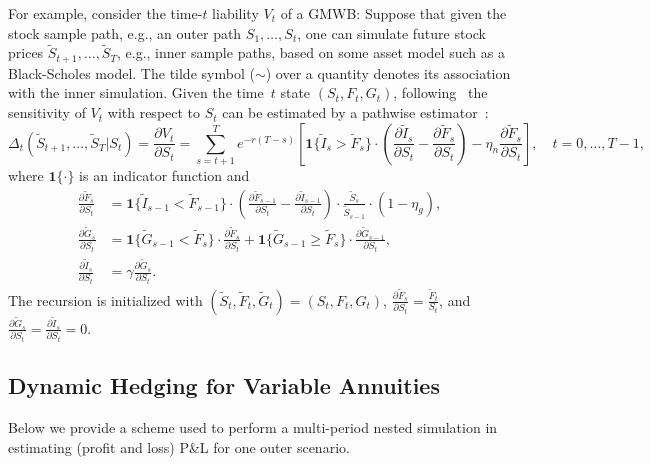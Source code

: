 \documentclass{article}
\newcommand{\Stilde}{\widetilde{S}}
\newcommand{\Itilde}{\widetilde{I}}
\newcommand{\Ftilde}{\widetilde{F}}
\newcommand{\Gtilde}{\widetilde{G}}
\begin{document}
For example, consider the time-$t$ liability $V_t$ of a GMWB:
Suppose that given the stock sample path, e.g., an outer path $S_1,\ldots,S_t$, one can simulate future stock prices $\Stilde_{t+1},\ldots,\Stilde_{T}$, e.g., inner sample paths, based on some asset model such as a Black-Scholes model.
The tilde symbol ($\sim$) over a quantity denotes its association with the inner simulation.
Given the time~$t$ state $(S_t,F_t,G_t)$, following~\cite{cathcart2015calculating} the sensitivity of $V_t$ with respect to $S_t$ can be estimated by a pathwise estimator~\citep{glasserman2004monte}:
\begin{equation}\label{eq:delta}
    \Delta_t(\Stilde_{t+1},\ldots,\Stilde_{T} | S_t) = \frac{\partial V_t}{\partial S_t} = \sum_{s=t+1}^{T} e^{-r(T-s)} \left[\bm{1}\{\Itilde_s > \Ftilde_s\}\cdot \left( \frac{\partial \Itilde_s}{ \partial S_t} - \frac{\partial \Ftilde_s}{ \partial S_t}\right)- \eta_n \frac{\partial \Ftilde_s}{ \partial S_t}\right], \quad t=0,\ldots,T-1,
\end{equation}
where $\bm{1}\{\cdot\}$ is an indicator function and
\begin{align*}
    \frac{\partial \Ftilde_s}{ \partial S_t} &= \bm{1}\{\Itilde_{s-1} < \Ftilde_{s-1}\}\cdot\left( \frac{\partial \Ftilde_{s-1}}{ \partial S_t} - \frac{\partial \Itilde_{s-1}}{ \partial S_t}\right) \cdot \frac{\Stilde_s}{\Stilde_{s-1}}\cdot (1-\eta_g),\\
    \frac{\partial \Gtilde_s}{ \partial S_t} &= \bm{1}\{\Gtilde_{s-1} < \Ftilde_{s}\}\cdot\frac{\partial \Ftilde_{s}}{ \partial S_t} + \bm{1}\{\Gtilde_{s-1} \geq \Ftilde_{s}\}\cdot\frac{\partial \Gtilde_{s-1}}{ \partial S_t},\\
    \frac{\partial \Itilde_s}{ \partial S_t} &= \gamma \frac{\partial \Gtilde_s}{ \partial S_t}.
\end{align*}
The recursion is initialized with $(\Stilde_t,\Ftilde_t,\Gtilde_t) = (S_t,F_t,G_t)$, $\frac{\partial \Ftilde_s}{ \partial S_t} = \frac{\Ftilde_t}{S_t}$, and $\frac{\partial \Gtilde_s}{ \partial S_t} = \frac{\partial \Itilde_s}{ \partial S_t} = 0$.


\subsection{Dynamic Hedging for Variable Annuities}\label{subsec:dynamicHedge}

Below we provide a scheme used to perform a multi-period nested simulation in estimating (profit and loss) P\&L for one outer scenario.
\end{document}
